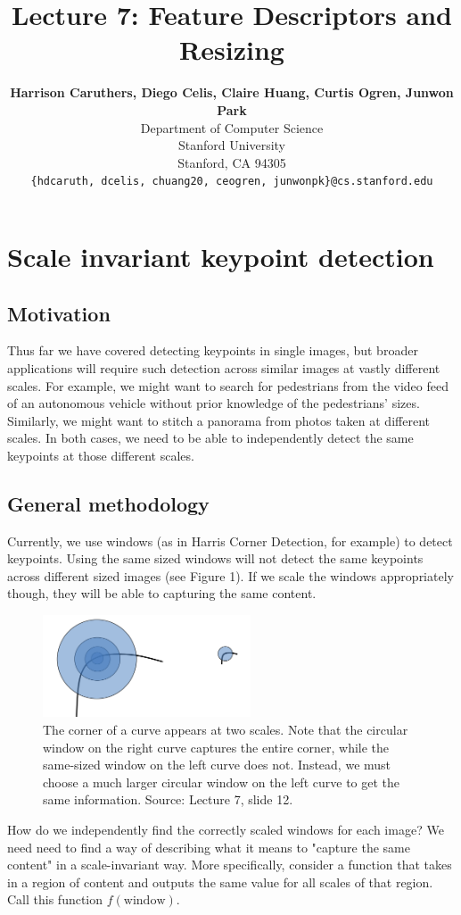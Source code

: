 \documentclass{article}
\title{Lecture 7: Feature Descriptors and Resizing}
\author{
  \textbf{Harrison Caruthers, Diego Celis, Claire Huang, Curtis Ogren, Junwon Park} \\
  Department of Computer Science\\
  Stanford University\\
  Stanford, CA 94305 \\
  \texttt{\{hdcaruth, dcelis, chuang20, ceogren, junwonpk\}@cs.stanford.edu} \\
}
\begin{document}
\maketitle

\section{Scale invariant keypoint detection}
\subsection{Motivation}
Thus far we have covered detecting keypoints in single images, but broader applications will require such detection across similar images at vastly different scales. For example, we might want to search for pedestrians from the video feed of an autonomous vehicle without prior knowledge of the pedestrians' sizes. Similarly, we might want to stitch a panorama from photos taken at different scales. In both cases, we need to be able to independently detect the same keypoints at those different scales.

\subsection{General methodology}
Currently, we use windows (as in Harris Corner Detection, for example) to detect keypoints. Using the same sized windows will not detect the same keypoints across different sized images (see Figure 1). If we scale the windows appropriately though, they will be able to capturing the same content.

\begin{figure}[h]
  \centering
  \includegraphics[width=0.55\textwidth]{corners}
  \caption{The corner of a curve appears at two scales. Note that the circular window on the right curve captures the entire corner, while the same-sized window on the left curve does not. Instead, we must choose a much larger circular window on the left curve to get the same information. Source: Lecture 7, slide 12.}
\end{figure}

How do we independently find the correctly scaled windows for each image? We need need to find a way of describing what it means to "capture the same content" in a scale-invariant way. More specifically, consider a function that takes in a region of content and outputs the same value for all scales of that region. Call this function $f(\text{window})$.
\end{document}
